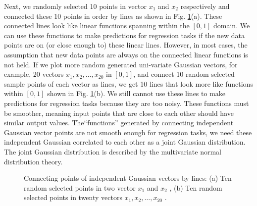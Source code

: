 \documentclass[preprint,12pt]{elsarticle}
\begin{document}
Next, we randomly selected 10 points in vector $x_1$ and $x_2$ respectively and connected these 10 points in order by lines as shown in Fig. \ref{FIG:4}(a). These connected lines look like linear functions spanning within the $[0, 1]$ domain. We can use these functions to make predictions for regression tasks if the new data points are on (or close enough to) these linear lines. However, in most cases, the assumption that new data points are always on the connected linear functions is not held. If we plot more random generated uni-variate Gaussian vectors, for example, 20 vectors $x_1, x_2, \ldots, x_{20}$ in $[0, 1]$, and connect 10 random selected sample points of each vector as lines, we get 10 lines that look more like functions within $[0, 1]$ shown in Fig. \ref{FIG:4}(b). We still cannot use these lines to make predictions for regression tasks because they are too noisy. These functions must be smoother, meaning input points that are close to each other should have similar output values. The``functions'' generated by connecting independent Gaussian vector points are not smooth enough for regression tasks, we need these independent Gaussian correlated to each other as a joint Gaussian distribution. The joint Gaussian distribution is described by the multivariate normal distribution theory.  

\begin{figure}[h!]
    \centering
    \qquad
    \caption{Connecting points of independent Gaussian vectors by lines: (a) Ten random selected points in two vector $x_1$ and $x_2$ , (b) Ten random selected points in twenty vectors $x_1, x_2, \ldots, x_{20}$ .}
    \label{FIG:4}
\end{figure}
\end{document}
